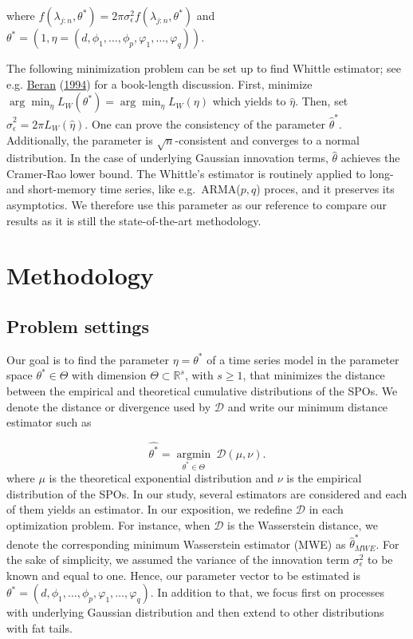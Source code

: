 \documentclass[
  11pt,
]{article}
\begin{document}
where
\(f\left(\lambda_{j: n}, \theta^{*}\right)=2 \pi \sigma_{\epsilon}^{2} f\left(\lambda_{j: n}, \theta^{*}\right)\)
and
\(\theta^{*}=(1, \eta = \left(d, \phi_{1}, \ldots, \phi_{p}, \varphi_{1}, \ldots, \varphi_{q}\right))\).

The following minimization problem can be set up to find Whittle
estimator; see e.g. \protect\hyperlink{ref-beran1994statistics}{Beran}
(\protect\hyperlink{ref-beran1994statistics}{1994}) for a book-length
discussion. First, minimize
\(\arg \min _{\eta} L_{W}\left(\theta^{*}\right)=\arg \min _{\eta} L_{W}(\eta)\)
which yields to \(\hat{\eta}\). Then, set
\(\hat{\sigma}_{\epsilon}^{2}=2 \pi L_{W}(\hat{\eta}).\) One can prove
the consistency of the parameter \(\hat \theta^*\). Additionally, the
parameter is \(\sqrt{n}\)-consistent and converges to a normal
distribution. In the case of underlying Gaussian innovation terms,
\(\hat \theta\) achieves the Cramer-Rao lower bound. The Whittle's
estimator is routinely applied to long- and short-memory time series,
like e.g.~ARMA(\(p,q\)) proces, and it preserves its asymptotics. We
therefore use this parameter as our reference to compare our results as
it is still the state-of-the-art methodology.

\hypertarget{methodology}{%
\section{Methodology}\label{methodology}}

\hypertarget{problem-settings}{%
\subsection{Problem settings}\label{problem-settings}}

Our goal is to find the parameter \(\eta = \theta^*\) of a time series
model in the parameter space \(\theta^* \in \Theta\) with dimension
\(\Theta \subset \mathbb{R}^s\), with $s\geq1$, that minimizes the
distance between the empirical and theoretical cumulative distributions
of the SPOs. We denote the distance or divergence used by
\(\mathcal{D}\) and write our minimum distance estimator such as

\[\hat{\theta^*}=\underset{\theta^* \in \Theta}{\operatorname{argmin}} \ \mathcal{D}\left({\mu}, \nu\right) .\]
where \(\mu\) is the theoretical exponential distribution and \(\nu\) is
the empirical distribution of the SPOs. In our study, several estimators
are considered and each of them yields an estimator. In our exposition,
we redefine \(\mathcal{D}\) in each optimization problem. For instance,
when \(\mathcal{D}\) is the Wasserstein distance, we denote the
corresponding minimum Wasserstein estimator (MWE) as
\(\hat \theta^*_{MWE}\). For the sake of simplicity, we assumed the
variance of the innovation term \(\sigma^2_\epsilon\) to be known and
equal to one. Hence, our parameter vector to be estimated is
\(\theta^* = (d, \phi_{1}, \ldots, \phi_{p}, \varphi_{1}, \ldots, \varphi_{q}).\)
In addition to that, we focus first on processes with underlying
Gaussian distribution and then extend to other distributions with fat
tails.
\end{document}
